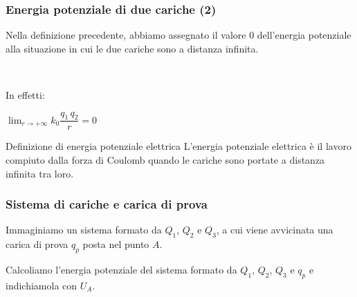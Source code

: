 \documentclass[handout]{beamer}
\theoremstyle{plain}
\begin{document}
\begin{frame}
\frametitle{Energia potenziale di due cariche (2)}
Nella definizione precedente, abbiamo assegnato il valore $ 0 $ dell'energia potenziale alla situazione in cui le due cariche sono a distanza infinita.
\pause

~

In effetti:
\begin{center}
$ \displaystyle \lim_{r \to + \infty} k_0 \dfrac{q_1 \, q_2}{r} = 0 $
\end{center}\pause

\begin{block}{Definizione di energia potenziale elettrica}
L'energia potenziale elettrica è il lavoro compiuto dalla forza di Coulomb quando le cariche sono portate a distanza infinita tra loro.
\end{block}
\end{frame}







\begin{frame}
\frametitle{Sistema di cariche e carica di prova}
Immaginiamo un sistema formato da $ Q_1 $, $ Q_2 $ e $ Q_3 $, a cui viene avvicinata una carica di prova $ q_p $ posta nel punto $ A $.

\begin{figure}
\end{figure}\pause

Calcoliamo l'energia potenziale del sistema formato da $ Q_1 $, $ Q_2 $, $ Q_3 $ e $ q_p $ e indichiamola con $ U_A $.
\end{frame}
\end{document}
